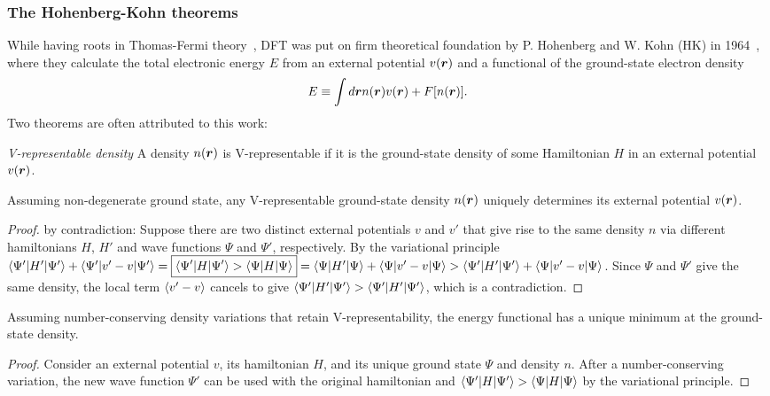 \subsubsection{The Hohenberg-Kohn theorems}
While having roots in Thomas-Fermi theory~\cite{Parr1989}, DFT was put on firm theoretical foundation by P. Hohenberg and W. Kohn (HK) in 1964~\cite{Hohenberg1964}, where they calculate the total electronic energy $E$ from an external potential $v(\boldsymbol{r})$ and a functional of the ground-state electron density
\begin{align}
E\equiv \int d\boldsymbol{r} n(\boldsymbol{r}) v(\boldsymbol{r}) + F[n(\boldsymbol{r})].
\end{align}
Two theorems are often attributed to this work:
\begin{definition}
\textit{V-representable density} A density $n(\boldsymbol{r})$ is V-representable if it is the ground-state density of some Hamiltonian $H$ in an external potential $v(\boldsymbol{r})$.
\end{definition}
\begin{theorem}
Assuming non-degenerate ground state, any V-representable ground-state density $n(\boldsymbol{r})$ uniquely determines its external potential $v(\boldsymbol{r})$. %
\end{theorem}
\begin{proof}
by contradiction: Suppose there are two distinct external potentials $v$ and $v'$ that give rise to the same density $n$ via different hamiltonians $H$, $H'$ and wave functions $\Psi$ and $\Psi'$, respectively. By the variational principle $\braket{\Psi'|H'|\Psi'}+\braket{\Psi'|v'-v|\Psi'}=\boxed{\braket{\Psi'|H|\Psi'}>\braket{\Psi|H|\Psi}}=\braket{\Psi|H'|\Psi}+\braket{\Psi|v'-v|\Psi}>\braket{\Psi'|H'|\Psi'}+\braket{\Psi|v'-v|\Psi}$. Since $\Psi$ and $\Psi'$ give the same density, the local term $\braket{v'-v}$ cancels to give $\braket{\Psi'|H'|\Psi'}>\braket{\Psi'|H'|\Psi'}$, which is a contradiction.
\end{proof}
\begin{theorem}
Assuming number-conserving density variations that retain V-representability, the energy functional has a unique minimum at the ground-state density.
\end{theorem}
\begin{proof}
Consider an external potential $v$, its hamiltonian $H$, and its unique ground state $\Psi$ and density $n$. After a number-conserving variation, the new wave function $\Psi'$ can be used with the original hamiltonian and $\braket{\Psi'|H|\Psi'}>\braket{\Psi|H|\Psi}$ by the variational principle.
\end{proof}

